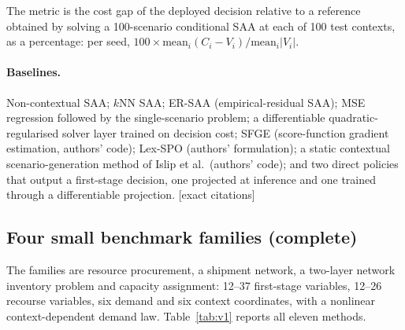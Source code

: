 \documentclass[11pt,a4paper]{article}
\theoremstyle{remark}
\newcommand{\todo}[1]{\textcolor{red!70!black}{[#1]}}
\begin{document}
The metric is the cost gap of the deployed decision relative to a reference
obtained by solving a 100-scenario conditional SAA at each of 100 test
contexts, as a percentage: per seed,
$100\times\mathrm{mean}_i(C_i-V_i)/\mathrm{mean}_i|V_i|$.

\paragraph{Baselines.}
Non-contextual SAA; $k$NN SAA; ER-SAA (empirical-residual SAA); MSE regression
followed by the single-scenario problem; a differentiable quadratic-regularised
solver layer trained on decision cost; SFGE (score-function gradient
estimation, authors' code); Lex-SPO (authors' formulation); a static
contextual scenario-generation method of Islip et al.\ (authors' code); and two
direct policies that output a first-stage decision, one projected at inference
and one trained through a differentiable projection.
\todo{exact citations}

\subsection{Four small benchmark families (complete)}

The families are resource procurement, a shipment network, a two-layer network
inventory problem and capacity assignment: 12--37 first-stage variables, 12--26
recourse variables, six demand and six context coordinates, with a nonlinear
context-dependent demand law. Table~\ref{tab:v1} reports all eleven methods.
\end{document}
